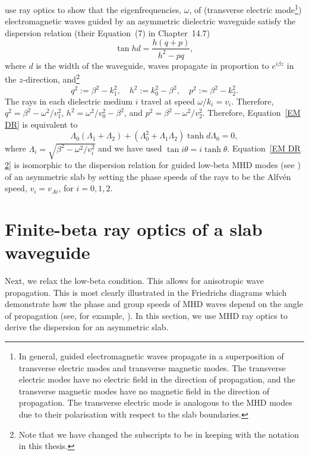 \documentclass[12pt]{../style-files/ociamthesis}
\begin{document}
	\cite{ram_etal84} use ray optics to show that the eigenfrequencies, $\omega$, of (transverse electric mode\footnote{In general, guided electromagnetic waves propagate in a superposition of transverse electric modes and transverse magnetic modes. The transverse electric modes have no electric field in the direction of propagation, and the transverse magnetic modes have no magnetic field in the direction of propagation. The transverse electric mode is analogous to the MHD modes due to their polarisation with respect to the slab boundaries.}) electromagnetic waves guided by an asymmetric dielectric waveguide satisfy the dispersion relation (their Equation~(7) in Chapter~14.7)
	\begin{equation}
	\tan{hd} = \frac{h(q + p)}{h^2 - pq}, \label{EM DR}
	\end{equation}
	where $d$ is the width of the waveguide, waves propagate in proportion to $e^{i\beta z}$ in the $z$-direction, and\footnote{Note that we have changed the subscripts to be in keeping with the notation in this thesis.} 
	\begin{equation}
	q^2 := \beta^2 - k_1^2, \quad h^2 := k_0^2 - \beta^2, \quad p^2 := \beta^2 - k_2^2.
	\end{equation}
	The rays in each dielectric medium $i$ travel at speed $\omega/k_i = v_i$. Therefore, $q^2 = \beta^2 - \omega^2/v_1^2$, $h^2 = \omega^2/v_0^2 - \beta^2$, and $p^2 = \beta^2 - \omega^2/v_2^2$. Therefore, Equation~\eqref{EM DR} is equivalent to
	\begin{equation}
	\Lambda_0(\Lambda_1 + \Lambda_2) + (\Lambda_0^2 + \Lambda_1\Lambda_2)\tanh{d\Lambda_0} = 0, \label{EM DR 2}
	\end{equation}
	where $\Lambda_i = \sqrt{\beta^2 - \omega^2/v_i^2}$ and we have used $\tan{i\theta} = i \tanh{\theta}$. Equation~\eqref{EM DR 2} is isomorphic to the dispersion relation for guided low-beta MHD modes (see \citealp{all_etal17}) of an asymmetric slab by setting the phase speeds of the rays to be the Alfv\'{e}n speed, $v_i = v_{Ai}$, for $i = 0, 1, 2$.
	
	
	\section{Finite-beta ray optics of a slab waveguide}
	\label{sec: finite beta}
	
	Next, we relax the low-beta condition. This allows for anisotropic wave propagation. This is most clearly illustrated in the Friedrichs diagrams which demonstrate how the phase and group speeds of MHD waves depend on the angle of propagation (see, for example, \citealp{goe_etal04,pri14}). In this section, we use MHD ray optics to derive the dispersion for an asymmetric slab.
	
\end{document}
